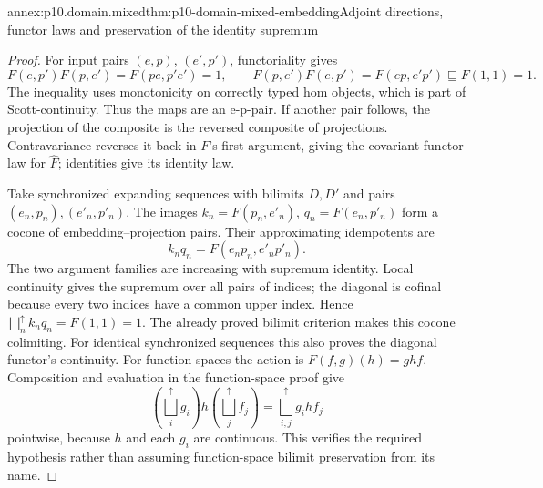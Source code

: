 \begin{annexitem}{annex:p10.domain.mixed}{thm:p10-domain-mixed-embedding}{Adjoint directions, functor laws and preservation of the identity supremum}
\begin{proof}
For input pairs \((e,p)\), \((e',p')\), functoriality gives
\[
 F(e,p')F(p,e')=F(pe,p'e')=1,
 \qquad
 F(p,e')F(e,p')=F(ep,e'p')\sqsubseteq F(1,1)=1.
\]
The inequality uses monotonicity on correctly typed hom objects,
which is part of Scott-continuity. Thus the maps are an e-p-pair.
If another pair follows, the projection of the composite is the
reversed composite of projections. Contravariance reverses it
back in \(F\)'s first argument, giving the covariant functor
law for \(\widehat F\); identities give its identity law.

Take synchronized expanding sequences with bilimits \(D,D'\)
and pairs \((e_n,p_n),(e'_n,p'_n)\). The images
\(k_n=F(p_n,e'_n)\), \(q_n=F(e_n,p'_n)\) form a cocone
of embedding--projection pairs. Their approximating idempotents are
\[
 k_nq_n=F(e_np_n,e'_np'_n).
\]
The two argument families are increasing with supremum identity.
Local continuity gives the supremum over all pairs of indices;
the diagonal is cofinal because every two indices have a common
upper index. Hence \(\bigsqcup_n^{\uparrow}k_nq_n=F(1,1)=1\).
The already proved bilimit criterion makes this cocone colimiting.
For identical synchronized sequences this also proves the diagonal
functor's continuity.
For function spaces the action is \(F(f,g)(h)=ghf\).
Composition and evaluation in the function-space proof give
\[
 (\bigsqcup_i^{\uparrow}g_i)h(\bigsqcup_j^{\uparrow}f_j)
       =\bigsqcup_{i,j}^{\uparrow}g_i h f_j
\]
pointwise, because \(h\) and each \(g_i\) are continuous.
This verifies the required hypothesis rather than assuming
function-space bilimit preservation from its name.
\end{proof}
\end{annexitem}

